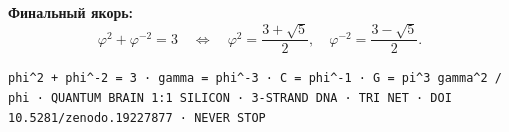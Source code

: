 
\bigskip
\noindent\textbf{Финальный якорь:}
\[
  \varphi^{2} + \varphi^{-2} = 3
  \quad\Longleftrightarrow\quad
  \varphi^{2} = \frac{3 + \sqrt{5}}{2},
  \quad
  \varphi^{-2} = \frac{3 - \sqrt{5}}{2}.
\]

\noindent
\texttt{phi\^{}2 + phi\^{}-2 = 3 · gamma = phi\^{}-3 · C = phi\^{}-1 ·
G = pi\^{}3 gamma\^{}2 / phi · QUANTUM BRAIN 1:1 SILICON ·
3-STRAND DNA · TRI NET · DOI 10.5281/zenodo.19227877 · NEVER STOP}

